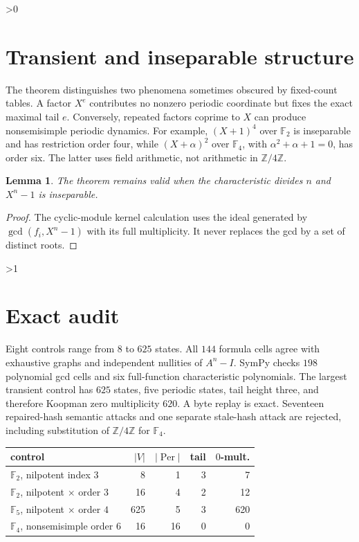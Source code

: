 \documentclass[11pt]{article}
\newtheorem{lemma}{Lemma}
\newcommand{\F}{\mathbb F}
\newcommand{\Per}{\operatorname{Per}}
\begin{document}
\ifnum\CRevisionRound>0
\section{Transient and inseparable structure}
The theorem distinguishes two phenomena sometimes obscured by fixed-count
tables.  A factor $X^e$ contributes no nonzero periodic coordinate but fixes
the exact maximal tail $e$.  Conversely, repeated factors coprime to $X$ can
produce nonsemisimple periodic dynamics.  For example, $(X+1)^4$ over $\F_2$
is inseparable and has restriction order four, while $(X+\alpha)^2$ over
$\F_4$, with $\alpha^2+\alpha+1=0$, has order six.  The latter uses field
arithmetic, not arithmetic in $\mathbb Z/4\mathbb Z$.

\begin{lemma}
The theorem remains valid when the characteristic divides $n$ and
$X^n-1$ is inseparable.
\end{lemma}
\begin{proof}
The cyclic-module kernel calculation uses the ideal generated by
$\gcd(f_i,X^n-1)$ with its full multiplicity.  It never replaces the gcd by a
set of distinct roots.
\end{proof}
\fi

\ifnum\CRevisionRound>1
\section{Exact audit}
Eight controls range from $8$ to $625$ states.  All $144$ formula cells agree
with exhaustive graphs and independent nullities of $A^n-I$.  SymPy checks
$198$ polynomial gcd cells and six full-function characteristic polynomials.
The largest transient control has $625$ states, five periodic states, tail
height three, and therefore Koopman zero multiplicity $620$.  A byte replay is
exact.  Seventeen repaired-hash semantic attacks and one separate stale-hash
attack are rejected, including substitution of $\mathbb Z/4\mathbb Z$ for
$\F_4$.

\begin{center}
\small
\begin{tabular}{lrrrr}
\toprule
control & $|V|$ & $|\Per|$ & tail & $0$-mult.\\
\midrule
$\F_2$, nilpotent index $3$ & 8 & 1 & 3 & 7\\
$\F_2$, nilpotent $\times$ order $3$ & 16 & 4 & 2 & 12\\
$\F_5$, nilpotent $\times$ order $4$ & 625 & 5 & 3 & 620\\
$\F_4$, nonsemisimple order $6$ & 16 & 16 & 0 & 0\\
\bottomrule
\end{tabular}
\end{center}
\end{document}
